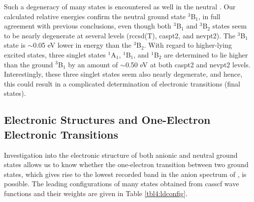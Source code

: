 \begin{refsection}
Such a degeneracy of many states is encountered as well in the neutral . Our calculated relative energies confirm the neutral ground state $^3$B$_1$, in full agreement with previous conclusions, \cite{c4:22, c4:24} even though both $^3$B$_1$ and $^3$B$_2$ states seem to be nearly degenerate at several levels (\acrshort{rccsd}(T), \acrshort{caspt2}, and \acrshort{nevpt2}). The $^3$B$_1$ state is $\sim$0.05 eV lower in energy than the $^3$B$_2$. With regard to higher-lying excited states, three singlet states $^1$A$_1$, $^1$B$_1$, and $^1$B$_2$ are determined to lie higher than the ground $^3$B$_1$ by an amount of $\sim$0.50 eV at both \acrshort{caspt2} and \acrshort{nevpt2} levels. Interestingly, these three singlet states seem also nearly degenerate, and hence, this could result in a complicated determination of electronic transitions (final states).



\subsection{Electronic Structures and One-Electron Electronic Transitions}



Investigation into the electronic structure of both anionic and neutral ground states allows us to know whether the one-electron transition between two ground states, which gives rise to the lowest recorded band in the anion spectrum of , is possible. The leading configurations of many states obtained from \acrshort{casscf} wave functions and their weights are given in Table \ref{tbl4:ldconfig}.



\end{refsection}
